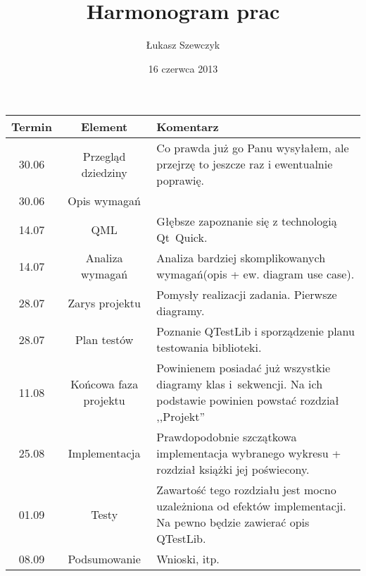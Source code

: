 \documentclass[11pt,twoside,a4paper,final]{article}
\begin{document}
\date{16 czerwca 2013}
\title{Harmonogram prac}

\author{Łukasz Szewczyk}

\maketitle

\begin{tabular}{|c|c|p{8cm}|}
\hline
Termin & Element & Komentarz\\
\hline
30.06 & Przegląd dziedziny & Co prawda już go Panu wysyłałem, 
ale przejrzę to jeszcze raz i ewentualnie poprawię. \\
\hline
30.06 & Opis wymagań &  \\
\hline
14.07 & QML & Głębsze zapoznanie się z technologią Qt~Quick. \\
\hline
14.07 & Analiza wymagań & Analiza bardziej skomplikowanych wymagań(opis + ew. diagram use case). \\
\hline
28.07 & Zarys projektu & Pomysły realizacji zadania. Pierwsze diagramy. \\
\hline
28.07 & Plan testów & Poznanie QTestLib i sporządzenie planu testowania biblioteki. \\
\hline
11.08 & Końcowa faza projektu & Powinienem posiadać już wszystkie diagramy klas i~sekwencji. Na ich podstawie powinien powstać rozdział ,,Projekt''\\
\hline
25.08 & Implementacja & Prawdopodobnie szczątkowa implementacja wybranego wykresu + rozdział książki jej poświecony. \\
\hline
01.09 & Testy & Zawartość tego rozdziału jest mocno uzależniona od efektów implementacji.
Na pewno będzie zawierać opis QTestLib.  \\
\hline
08.09 & Podsumowanie & Wnioski, itp.\\
\hline
\end{tabular}
\end{document}
